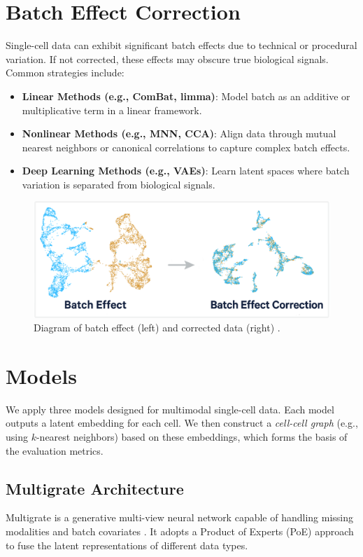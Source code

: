\documentclass{article}
\begin{document}
\section{Batch Effect Correction}
Single-cell data can exhibit significant batch effects due to technical or procedural variation. 
If not corrected, these effects may obscure true biological signals. Common strategies include:

\begin{itemize}
 \item \textbf{Linear Methods (e.g., ComBat, limma)}:  
   Model batch as an additive or multiplicative term in a linear framework.
 \item \textbf{Nonlinear Methods (e.g., MNN, CCA)}:  
   Align data through mutual nearest neighbors or canonical correlations to capture complex batch effects.
 \item \textbf{Deep Learning Methods (e.g., VAEs)}:  
   Learn latent spaces where batch variation is separated from biological signals.
\end{itemize}

\begin{figure}[H]
  \centering
  \includegraphics[width=0.8\linewidth]{BatchCorrection}
  \caption{Diagram of batch effect (left) and corrected data (right) \cite{10xgenomics_batch_effect}.}
  \label{fig:batch_effect}
\end{figure}

\section{Models}
We apply three models designed for multimodal single-cell data. Each model outputs a latent embedding 
for each cell. We then construct a \emph{cell-cell graph} (e.g., using \(k\)-nearest neighbors) 
based on these embeddings, which forms the basis of the evaluation metrics.

\subsection{Multigrate Architecture}
\label{sec:multigrate}
Multigrate is a generative multi-view neural network capable of handling missing modalities 
and batch covariates \cite{lotfollahi2022multigrate}. It adopts a Product of Experts (PoE) approach 
to fuse the latent representations of different data types.
\end{document}
